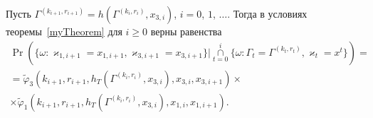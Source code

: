 \begin{corollary}
Пусть $\Gamma^{(k_{i+1}, r_{i+1})}=h(\Gamma^{(k_i, r_i)}, x_{3, i})$,  $i=0$,  $1$,  $\ldots$. Тогда в условиях теоремы~\ref{myTheorem} для $i \geqslant 0$ верны равенства
\begin{multline}
\Pr (\{ \omega \colon \varkappa_{1, i+1} = x_{1, i+1},  \varkappa_{3, i+1} = x_{3, i+1}\} |\mathop{\cap}\limits_{t=0}^{i}\{\omega\colon \Gamma_t=\Gamma^{(k_t, r_t)},  \varkappa_t=x^t\})=\\
=\widetilde{\varphi}_3(k_{i+1}, r_{i+1}, h_T(\Gamma^{(k_i, r_i)}, x_{3, i}), x_{3, i}, x_{3, i+1}) \times \\ \times \widetilde{\varphi}_1(k_{i+1}, r_{i+1}, h_T(\Gamma^{(k_i, r_i)}, x_{3, i}), x_{1, i}, x_{1, i+1}).
\label{kappa:1:kappa:3:conditional}
\end{multline}
\end{corollary}
